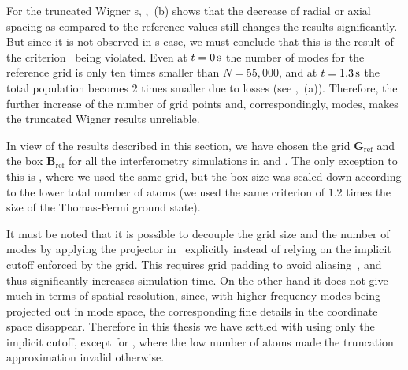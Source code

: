For the truncated Wigner s, ,~(b) shows that the decrease of radial or axial spacing as compared to the reference values still changes the results significantly.
But since it is not observed in s case, we must conclude that this is the result of the criterion~ being violated.
Even at $t=0\mbox{\ensuremath{\,\mathrm{s}}}$ the number of modes for the reference grid is only ten times smaller than $N=55,000$, and at $t=1.3\mbox{\ensuremath{\,\mathrm{s}}}$ the total population becomes $2$ times smaller due to losses (see ,~(a)).
Therefore, the further increase of the number of grid points and, correspondingly, modes, makes the truncated Wigner results unreliable.

In view of the results described in this section, we have chosen the grid $\mathbf{G}_{\mathrm{ref}}$ and the box $\mathbf{B}_{\mathrm{ref}}$ for all the interferometry simulations in  and .
The only exception to this is , where we used the same grid, but the box size was scaled down according to the lower total number of atoms (we used the same criterion of $1.2$ times the size of the Thomas-Fermi ground state).

It must be noted that it is possible to decouple the grid size and the number of modes by applying the projector in~ explicitly instead of relying on the implicit cutoff enforced by the grid.
This requires grid padding to avoid aliasing~\cite{Norrie2006}, and thus significantly increases simulation time.
On the other hand it does not give much in terms of spatial resolution, since, with higher frequency modes being projected out in mode space, the corresponding fine details in the coordinate space disappear.
Therefore in this thesis we have settled with using only the implicit cutoff, except for , where the low number of atoms made the truncation approximation invalid otherwise.
